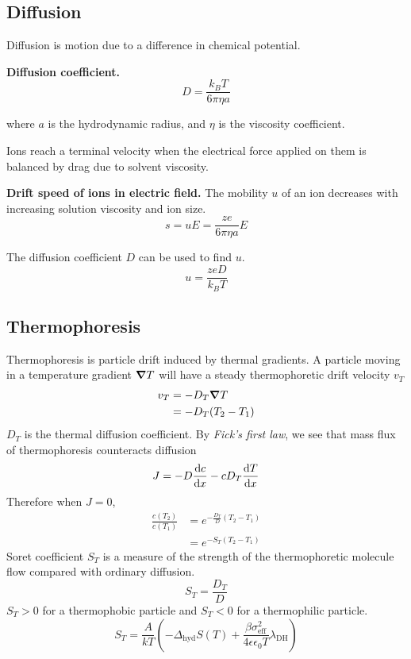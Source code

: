 \subsection*{Diffusion} %
Diffusion is motion due to a difference in chemical potential.

\textbf{Diffusion coefficient.} $$D = \frac{k_B T}{6 \pi \eta a}$$

where $a$ is the hydrodynamic radius, and $\eta$ is the viscosity coefficient.

Ions reach a terminal velocity when the electrical force applied on them is balanced
by drag due to solvent viscosity.
\vspace{\baselineskip}

\textbf{Drift speed of ions in electric field.} The mobility $u$ of an ion decreases with increasing solution viscosity and ion size.
$$s = uE = \frac{ze}{6 \pi \eta a} E$$

The diffusion coefficient $D$ can be used to find $u$.
\begin{equation*}
    u = \frac{zeD}{k_B T}
\end{equation*}

\subsection*{Thermophoresis}
Thermophoresis is particle drift induced by thermal gradients. A particle moving in a temperature gradient
$\grad T$ will have a steady thermophoretic drift velocity $v_T$
\begin{equation*}
    \begin{aligned}
        v_T &=-D_T \grad T \\
        &= -D_T (T_2 - T_1)
    \end{aligned}
\end{equation*}
$D_T$ is the thermal diffusion coefficient.
By \textit{Fick's first law}, we see that mass flux of thermophoresis counteracts diffusion
\begin{equation*}
    J = -D \dv{c}{x} - c D_T \dv{T}{x}
\end{equation*}
Therefore when $J = 0$,
\begin{equation*}
    \begin{aligned}
        \frac{c(T_2)}{c(T_1)} &= e^{-\frac{D_T}{D}(T_2 - T_1)} \\
        &= e^{-S_T(T_2 - T_1)}
    \end{aligned}
\end{equation*}
Soret coefficient $S_T$ is a measure of the strength of the thermophoretic molecule flow compared with ordinary diffusion.
\begin{equation*}
    S_T = \frac{D_T}{D}
\end{equation*}
$S_T > 0$ for a thermophobic particle and $S_T < 0$ for a thermophilic particle.
\begin{equation*}
    S_T = \frac{A}{kT} \left( - \Delta_{\textrm{hyd}}S(T) + \frac{\beta \sigma^2_{\textrm{eff}}}{4 \epsilon \epsilon_0T}\lambda_{\textrm{DH}}\right)
\end{equation*}
